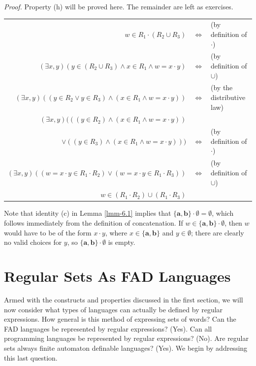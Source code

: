 \begin{lmm}
\emph{Proof.} Property (h) will be proved here. The remainder are left as
exercises.

\begin{center}\begin{tabular}{rcl}
$w \in R_1 \cdot (R_2 \cup R_3)$ & $\Leftrightarrow$ & (by definition of
	$\cdot$) \\
$(\exists x,y)(y \in (R_2 \cup R_3) \wedge x \in R_1 \wedge w = x \cdot y)$ &
	$\Leftrightarrow$ & (by definition of $\cup$) \\
$(\exists x,y)((y \in R_2 \vee y \in R_3) \wedge (x \in R_1 \wedge w = x \cdot
	y))$ & $\Leftrightarrow$ & (by the distributive law) \\
$(\exists x,y)(((y \in R_2) \wedge (x \in R_1 \wedge w = x \cdot y))$ && \\
$\vee ((y \in R_3) \wedge (x \in R_1 \wedge w = x \cdot y)))$ & $\Leftrightarrow$ 
	& (by definition of $\cdot$) \\
$(\exists x,y)((w = x \cdot y \in R_1 \cdot R_2) \vee (w = x \cdot y \in R_1
	\cdot R_3))$ & $\Leftrightarrow$ & (by definition of $\cup$) \\
$w \in (R_1 \cdot R_2) \cup (R_1 \cdot R_3)$ &&
\end{tabular}\end{center}
\end{lmm}

Note that identity (c) in Lemma \ref{lmm-6.1} implies that $\{\pmb{a},\pmb{b}\}\cdot
\emptyset = \emptyset$, which follows immediately from the definition of
concatenation. If $w \in \{\pmb{a},\pmb{b}\} \cdot \emptyset$, then $w$ would
have to be of the form $x \cdot y$, where $x \in \{\pmb{a},\pmb{b}\}$ and
$y \in \emptyset$; there are clearly no valid choices for $y$, so $\{\pmb{a},
\pmb{b}\} \cdot \emptyset$ is empty.

\section{Regular Sets As FAD Languages}\label{sec-6.2}

Armed with the constructs and properties discussed in the first section, we will
now consider what types of languages can actually be defined by regular
expressions. How general is this method of expressing sets of words? Can the FAD
languages be represented by regular expressions? (Yes). Can all programming
languages be represented by regular expressions? (No). Are regular sets always
finite automaton definable languages? (Yes). We begin by addressing this last
question.

